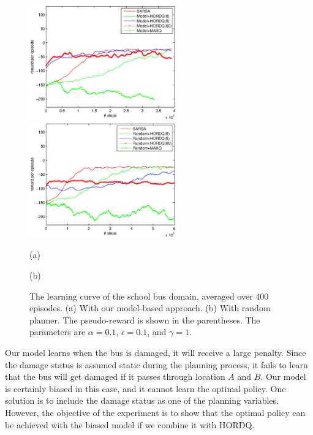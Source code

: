 \documentclass{article} %
\begin{document}
\begin{figure}[t]
 \begin{minipage}[b]{0.5\linewidth}
    \includegraphics[width=2.5in] {Approx.eps}
\end{minipage}
\begin{minipage}[b]{0.5\linewidth}
    \includegraphics[width=2.5in] {Random.eps}
\end{minipage}
\begin{minipage}[b]{0.5\linewidth} \centering (a) \end{minipage}
\begin{minipage}[b]{0.5\linewidth} \centering (b) \end{minipage}

\caption{The learning curve of the school bus domain, averaged over 400 episodes. (a) With our model-based approach. (b) With random planner.
The pseudo-reward is shown in the parentheses. The parameters are $\alpha=0.1$, $\epsilon=0.1$, and $\gamma=1$.
}
\label{fig:res}
\end{figure}

Our model learns when the bus is damaged, it will receive a large penalty.  
Since the damage status is assumed static during the planning process, 
it fails to learn that the bus will get damaged if it passes through
location $A$ and $B$. Our model is certainly biased in this case, and
it cannot learn the optimal policy. One solution is to include the damage 
status as one of the planning variables. However, the objective of 
the experiment is to show that the optimal policy can be achieved
with the biased model if we combine it with HORDQ. 
\end{document}
